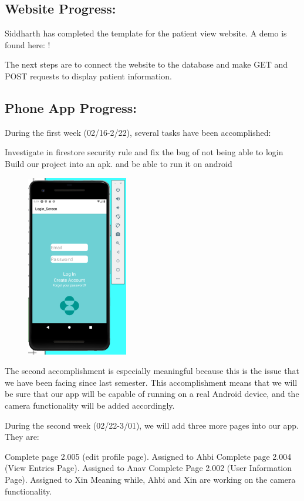 \documentclass[]{book}
\begin{document}
\subsection{Website Progress:}\label{website-progress-1}

Siddharth has completed the template for the patient view website. A
demo is found here: !

The next steps are to connect the website to the database and make GET
and POST requests to display patient information.

\subsection{Phone App Progress:}\label{phone-app-progress-1}

During the first week (02/16-2/22), several tasks have been
accomplished:

Investigate in firestore security rule and fix the bug of not being able
to login Build our project into an apk. and be able to run it on android

\begin{figure}
\centering
\includegraphics{images/mobile_signin.png}
\caption{}
\end{figure}

The second accomplishment is especially meaningful because this is the
issue that we have been facing since last semester. This accomplishment
means that we will be sure that our app will be capable of running on a
real Android device, and the camera functionality will be added
accordingly.

During the second week (02/22-3/01), we will add three more pages into
our app. They are:

Complete page 2.005 (edit profile page). Assigned to Ahbi Complete page
2.004 (View Entries Page). Assigned to Anav Complete Page 2.002 (User
Information Page). Assigned to Xin Meaning while, Ahbi and Xin are
working on the camera functionality.
\end{document}
